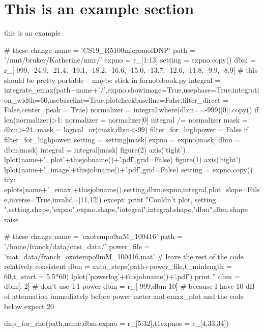 \section{This is an example section}
this is an example

\begin{python}
	# these change
	name = 'CS19_R5100micromolDNP'
	path = '/mnt/bruker/Katherine/nmr/'
	expno = r_[1:13]
	setting = expno.copy()
	dbm = r_[-999,
	  -24.9,
	  -21.4,
	  -19.1,
	  -18.2,
	  -16.6,
	  -15.0,
	  -13.7,
	  -12.6,
	  -11.8,
	  -9.9,
	  -8.9]
	# this should be pretty portable -- maybe stick in fornotebook.py
	integral = integrate_emax(path+name+'/',expno,showimage=True,usephase=True,integration_width=60,usebaseline=True,plotcheckbaseline=False,filter_direct = False,center_peak = True)
	normalizer = integral[where(dbm==-999)[0]].copy()
	if len(normalizer)>1:
	   normalizer = normalizer[0]
	integral /= normalizer
	mask = dbm>-24.
	mask = logical_or(mask,dbm<-99)
	filter_for_highpower = False
	if filter_for_highpower:
	   setting = setting[mask]
	   expno = expno[mask]
	   dbm = dbm[mask]
	   integral = integral[mask]
	figure(2)
	axis('tight')
	lplot(name+'_plot'+thisjobname()+'.pdf',grid=False)
	figure(1)
	axis('tight')
	lplot(name+'_image'+thisjobname()+'.pdf',grid=False)
	setting = expno.copy()
	try:
	   eplots(name+'_emax'+thisjobname(),setting,dbm,expno,integral,plot_slope=False,inverse=True,invalid=[11,12])
	except:
	   print "Couldn't plot, setting ",setting.shape,"expno",expno.shape,"integral",integral.shape,"dbm",dbm.shape
	   raise
\end{python}

\begin{tiny}
\begin{python}
# these change
name = 'oxotempo9mM_100416'
path = '/home/franck/data/cnsi_data/'
power_file = 'mat_data/franck_oxotempo9mM_100416.mat'
# leave the rest of the code relatively consistent
dbm = auto_steps(path+power_file,t_minlength = 60,t_start = 5.5*60)
lplot('powerlog'+thisjobname()+'.pdf')
print ''%
dbm = dbm[:-2] # don't use T1 power
dbm = r_[-999,dbm-10] # because I have 10 dB of attenuation immediately before power meter and emax_plot and the code below expect 20

dnp_for_rho(path,name,dbm,expno = r_[5:32],t1expnos = r_[4,33,34])
\end{python}
\end{tiny}
